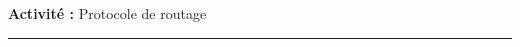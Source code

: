 \documentclass[11pt,a4paper]{article}
\newenvironment{NSI}[2]
{
	\noindent
	\setlength{\fboxsep}{0cm}\setlength{\fboxrule}{0pt}\framebox[19cm]{
		\setlength{\fboxsep}{0.25cm}\setlength{\fboxrule}{1pt}
		\Huge{\textbf{#1 :}}
		\hspace{0.5cm}{\huge{#2}}\hfill
	}
	{\newline \rule[0cm]{\linewidth}{0.05em}}
}
\newcounter{num}
\newcounter{rem}
\begin{document}
\setcounter{num}{0}
\setcounter{rem}{0}
\renewcommand{\arraystretch}{1.25}
\setlength{\parindent}{0cm}

\newcommand{\Frac}[2]{\displaystyle{\frac{#1}{#2}}}






\begin{huge}
\textbf{Activité : } Protocole de routage
\end{huge}\medskip
\hrule

%
%
%
%
%
%
%
\end{document}
